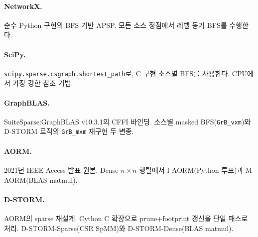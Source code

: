 \documentclass[11pt,a4paper]{article}
\begin{document}
\begin{table}[H]\centering
\caption{6개 기법 계열의 핵심 특징 비교}
\label{tab:families}
\small
{}
\end{table}

\paragraph{NetworkX.} 순수 Python 구현의 BFS 기반 APSP. 모든 소스 정점에서 레벨 동기 BFS를 수행한다.

\paragraph{SciPy.} \texttt{scipy.sparse.csgraph.shortest\_path}로, C 구현 소스별 BFS를 사용한다. CPU에서 가장 강한 참조 기법.

\paragraph{GraphBLAS.} SuiteSparse:GraphBLAS v10.3.1의 CFFI 바인딩. 소스별 masked BFS(\texttt{GrB\_vxm})와 D-STORM 로직의 \texttt{GrB\_mxm} 재구현 두 변종.

\paragraph{AORM.} 2021년 IEEE Access 발표 원본. Dense $n \times n$ 행렬에서 I-AORM(Python 루프)과 M-AORM(BLAS matmul).

\paragraph{D-STORM.} AORM의 sparse 재설계. Cython C 확장으로 prune+footprint 갱신을 단일 패스로 처리. D-STORM-Sparse(CSR SpMM)와 D-STORM-Dense(BLAS matmul).
\end{document}
